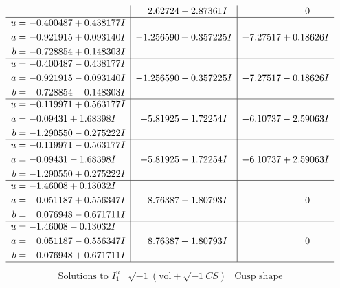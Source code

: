 \documentclass[1p]{elsarticle_modified}
\theoremstyle{definition}
\newcommand{\I}{\sqrt{-1}}
\begin{document}
$$\begin{array}{c|c|c}
 & \phantom{-}2.62724 - 2.87361 I & \phantom{-0.000000 } 0 \\ \hline\begin{aligned}
u &= -0.400487 + 0.438177 I \\
a &= -0.921915 + 0.093140 I \\
b &= -0.728854 + 0.148303 I\end{aligned}
 & -1.256590 + 0.357225 I & -7.27517 + 0.18626 I \\ \hline\begin{aligned}
u &= -0.400487 - 0.438177 I \\
a &= -0.921915 - 0.093140 I \\
b &= -0.728854 - 0.148303 I\end{aligned}
 & -1.256590 - 0.357225 I & -7.27517 - 0.18626 I \\ \hline\begin{aligned}
u &= -0.119971 + 0.563177 I \\
a &= -0.09431 + 1.68398 I \\
b &= -1.290550 - 0.275222 I\end{aligned}
 & -5.81925 + 1.72254 I & -6.10737 - 2.59063 I \\ \hline\begin{aligned}
u &= -0.119971 - 0.563177 I \\
a &= -0.09431 - 1.68398 I \\
b &= -1.290550 + 0.275222 I\end{aligned}
 & -5.81925 - 1.72254 I & -6.10737 + 2.59063 I \\ \hline\begin{aligned}
u &= -1.46008 + 0.13032 I \\
a &= \phantom{-}0.051187 + 0.556347 I \\
b &= \phantom{-}0.076948 - 0.671711 I\end{aligned}
 & \phantom{-}8.76387 - 1.80793 I & \phantom{-0.000000 } 0 \\ \hline\begin{aligned}
u &= -1.46008 - 0.13032 I \\
a &= \phantom{-}0.051187 - 0.556347 I \\
b &= \phantom{-}0.076948 + 0.671711 I\end{aligned}
 & \phantom{-}8.76387 + 1.80793 I & \phantom{-0.000000 } 0\\
 \hline 
 \end{array}$$\newpage$$\begin{array}{c|c|c}  
\text{Solutions to }I^u_{1}& \I (\text{vol} + \sqrt{-1}CS) & \text{Cusp shape}\\

\end{array}$$
\end{document}

